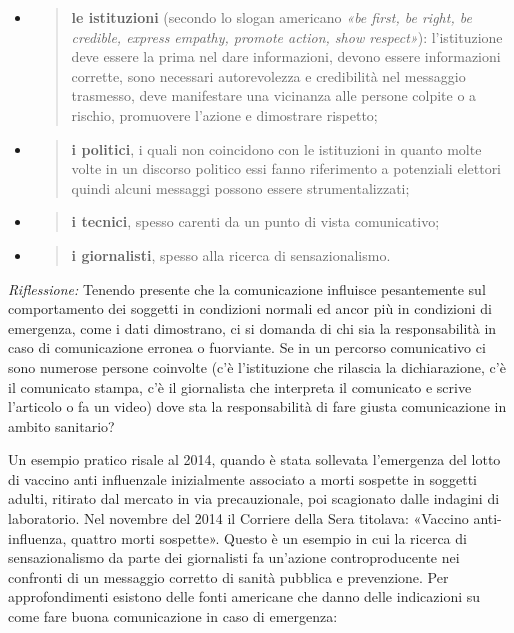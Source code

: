 \documentclass[]{article}
\begin{document}
\begin{itemize}
\item
  \begin{quote}
  \textbf{le istituzioni} (secondo lo slogan americano \emph{«be first,
  be right, be credible, express empathy, promote action, show
  respect»}): l'istituzione deve essere la prima nel dare informazioni,
  devono essere informazioni corrette, sono necessari autorevolezza e
  credibilità nel messaggio trasmesso, deve manifestare una vicinanza
  alle persone colpite o a rischio, promuovere l'azione e dimostrare
  rispetto;
  \end{quote}
\item
  \begin{quote}
  \textbf{i politici}, i quali non coincidono con le istituzioni in
  quanto molte volte in un discorso politico essi fanno riferimento a
  potenziali elettori quindi alcuni messaggi possono essere
  strumentalizzati;
  \end{quote}
\item
  \begin{quote}
  \textbf{i tecnici}, spesso carenti da un punto di vista comunicativo;
  \end{quote}
\item
  \begin{quote}
  \textbf{i giornalisti}, spesso alla ricerca di sensazionalismo.
  \end{quote}
\end{itemize}

\emph{Riflessione:} Tenendo presente che la comunicazione influisce
pesantemente sul comportamento dei soggetti in condizioni normali ed
ancor più in condizioni di emergenza, come i dati dimostrano, ci si
domanda di chi sia la responsabilità in caso di comunicazione erronea o
fuorviante. Se in un percorso comunicativo ci sono numerose persone
coinvolte (c'è l'istituzione che rilascia la dichiarazione, c'è il
comunicato stampa, c'è il giornalista che interpreta il comunicato e
scrive l'articolo o fa un video) dove sta la responsabilità di fare
giusta comunicazione in ambito sanitario?

Un esempio pratico risale al 2014, quando è stata sollevata l'emergenza
del lotto di vaccino anti influenzale inizialmente associato a morti
sospette in soggetti adulti, ritirato dal mercato in via precauzionale,
poi scagionato dalle indagini di laboratorio. Nel novembre del 2014 il
Corriere della Sera titolava: «Vaccino anti-influenza, quattro morti
sospette». Questo è un esempio in cui la ricerca di sensazionalismo da
parte dei giornalisti fa un'azione controproducente nei confronti di un
messaggio corretto di sanità pubblica e prevenzione. Per approfondimenti
esistono delle fonti americane che danno delle indicazioni su come fare
buona comunicazione in caso di emergenza:
\end{document}
